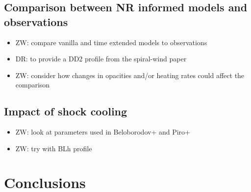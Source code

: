 \documentclass[fleqn,usenatbib]{mnras}
\begin{document}
\subsection{Comparison between NR informed models and observations}
\begin{itemize}
    \item ZW: compare vanilla and time extended models to observations
    \item DR: to provide a DD2 profile from the spiral-wind paper
    \item ZW: consider how changes in opacities and/or heating rates could affect the comparison
\end{itemize}

\subsection{Impact of shock cooling}
\begin{itemize}
    \item ZW: look at parameters used in Beloborodov+ and Piro+
    \item ZW: try with BLh profile
\end{itemize}

\section{Conclusions}





\bsp	%
\label{lastpage}
\end{document}
